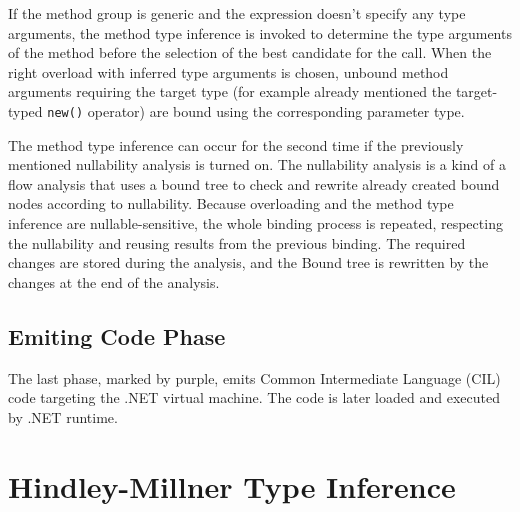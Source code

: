 If the method group is generic and the expression doesn’t specify any type arguments, the method type inference is invoked to determine the type arguments of the method before the selection of the best candidate for the call.
When the right overload with inferred type arguments is chosen, unbound method arguments requiring the target type (for example already mentioned the target-typed \texttt{new()} operator) are bound using the corresponding parameter type.
\par
The method type inference can occur for the second time if the previously mentioned nullability analysis is turned on. 
The nullability analysis is a kind of a flow analysis that uses a bound tree to check and rewrite already created bound nodes according to nullability. 
Because overloading and the method type inference are nullable-sensitive, the whole binding process is repeated, respecting the nullability and reusing results from the previous binding. 
The required changes are stored during the analysis, and the Bound tree is rewritten by the changes at the end of the analysis.

\subsection{Emiting Code Phase}

The last phase, marked by purple, emits Common Intermediate Language (CIL) code targeting the .NET virtual machine.
The code is later loaded and executed by .NET runtime.

\section{Hindley-Millner Type Inference} \label{sect03:HM}

